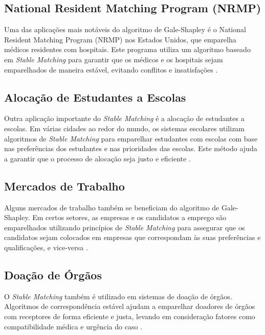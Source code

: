 \documentclass[12pt]{article}
\begin{document}
\subsection{National Resident Matching Program (NRMP)}

Uma das aplicações mais notáveis do algoritmo de Gale-Shapley é o National Resident Matching Program (NRMP) nos Estados Unidos, que emparelha médicos residentes com hospitais. Este programa utiliza um algoritmo baseado em \textit{Stable Matching} para garantir que os médicos e os hospitais sejam emparelhados de maneira estável, evitando conflitos e insatisfações \cite{roth:90}.

\subsection{Alocação de Estudantes a Escolas}

Outra aplicação importante do \textit{Stable Matching} é a alocação de estudantes a escolas. Em várias cidades ao redor do mundo, os sistemas escolares utilizam algoritmos de \textit{Stable Matching} para emparelhar estudantes com escolas com base nas preferências dos estudantes e nas prioridades das escolas. Este método ajuda a garantir que o processo de alocação seja justo e eficiente \cite{abdulkadirouglu2003school}.

\subsection{Mercados de Trabalho}

Alguns mercados de trabalho também se beneficiam do algoritmo de Gale-Shapley. Em certos setores, as empresas e os candidatos a emprego são emparelhados utilizando princípios de \textit{Stable Matching} para assegurar que os candidatos sejam colocados em empresas que correspondam às suas preferências e qualificações, e vice-versa \cite{hatfield2005matching}.

\subsection{Doação de Órgãos}

O \textit{Stable Matching} também é utilizado em sistemas de doação de órgãos. Algoritmos de correspondência estável ajudam a emparelhar doadores de órgãos com receptores de forma eficiente e justa, levando em consideração fatores como compatibilidade médica e urgência do caso \cite{roth2005kidney}.
\end{document}
